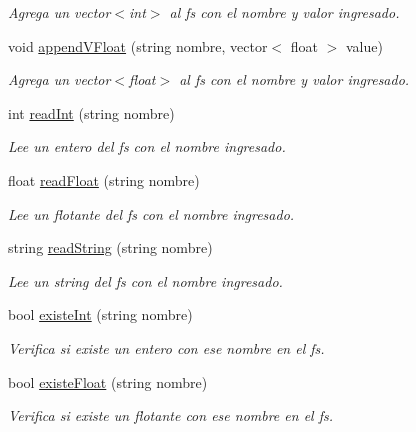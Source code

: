 \begin{DoxyCompactItemize}
\begin{DoxyCompactList}\small\item\em Agrega un vector$<$int$>$ al fs con el nombre y valor ingresado. \end{DoxyCompactList}\item 
void \mbox{\hyperlink{classFSManager_ad6419bbb1dbc6c1059642416045dbd99}{append\+V\+Float}} (string nombre, vector$<$ float $>$ value)
\begin{DoxyCompactList}\small\item\em Agrega un vector$<$float$>$ al fs con el nombre y valor ingresado. \end{DoxyCompactList}\item 
int \mbox{\hyperlink{classFSManager_a819ea57611717a89633a5b02cb4d0f10}{read\+Int}} (string nombre)
\begin{DoxyCompactList}\small\item\em Lee un entero del fs con el nombre ingresado. \end{DoxyCompactList}\item 
float \mbox{\hyperlink{classFSManager_a5362f82406fa9501f3c5126987565dc1}{read\+Float}} (string nombre)
\begin{DoxyCompactList}\small\item\em Lee un flotante del fs con el nombre ingresado. \end{DoxyCompactList}\item 
string \mbox{\hyperlink{classFSManager_ac8de8da2e2ebf395340b46b353cec02e}{read\+String}} (string nombre)
\begin{DoxyCompactList}\small\item\em Lee un string del fs con el nombre ingresado. \end{DoxyCompactList}\item 
bool \mbox{\hyperlink{classFSManager_aae892b79cec4fc940972e9ab008e241e}{existe\+Int}} (string nombre)
\begin{DoxyCompactList}\small\item\em Verifica si existe un entero con ese nombre en el fs. \end{DoxyCompactList}\item 
bool \mbox{\hyperlink{classFSManager_a73be0c1d4d7aa7584f41c7bab0075bb2}{existe\+Float}} (string nombre)
\begin{DoxyCompactList}\small\item\em Verifica si existe un flotante con ese nombre en el fs. \end{DoxyCompactList}\item 

\end{DoxyCompactItemize}
